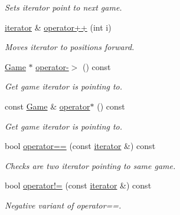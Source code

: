 \begin{DoxyCompactItemize}
\begin{DoxyCompactList}\small\item\em Sets iterator point to next game. \item\end{DoxyCompactList}\item 
\hyperlink{classpgn_1_1GameCollection_1_1iterator}{iterator} \& \hyperlink{classpgn_1_1GameCollection_1_1iterator_ab728b4cdfc18844ee564b74443b09bdf}{operator++} (int i)
\begin{DoxyCompactList}\small\item\em Moves iterator to {\itshape  positions forward. \/}\item\end{DoxyCompactList}\item 
\hyperlink{classpgn_1_1Game}{Game} $\ast$ \hyperlink{classpgn_1_1GameCollection_1_1iterator_a245601d25335e1ba67874d3d70382bb0}{operator-\/$>$} () const 
\begin{DoxyCompactList}\small\item\em Get game iterator is pointing to. \item\end{DoxyCompactList}\item 
const \hyperlink{classpgn_1_1Game}{Game} \& \hyperlink{classpgn_1_1GameCollection_1_1iterator_ae1c72b3ca9c338ccc117315f7551eea2}{operator$\ast$} () const 
\begin{DoxyCompactList}\small\item\em Get game iterator is pointing to. \item\end{DoxyCompactList}\item 
bool \hyperlink{classpgn_1_1GameCollection_1_1iterator_ad5b3ab7c17b8bcd6dcc1122256abda56}{operator==} (const \hyperlink{classpgn_1_1GameCollection_1_1iterator}{iterator} \&) const 
\begin{DoxyCompactList}\small\item\em Checks are two iterator pointing to same game. \item\end{DoxyCompactList}\item 
\hypertarget{classpgn_1_1GameCollection_1_1iterator_ab93ed70b78aa6461dc5ea515a3a0592e}{
bool \hyperlink{classpgn_1_1GameCollection_1_1iterator_ab93ed70b78aa6461dc5ea515a3a0592e}{operator!=} (const \hyperlink{classpgn_1_1GameCollection_1_1iterator}{iterator} \&) const }
\label{classpgn_1_1GameCollection_1_1iterator_ab93ed70b78aa6461dc5ea515a3a0592e}

\begin{DoxyCompactList}\small\item\em Negative variant of operator==. \item\end{DoxyCompactList}\end{DoxyCompactItemize}


